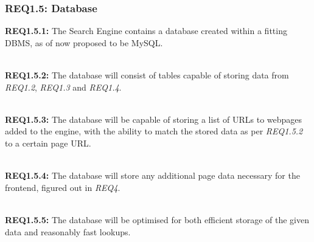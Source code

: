 \subsubsection{REQ1.5: Database}

\textbf{REQ1.5.1:} The Search Engine contains a database created within a fitting DBMS, as of now proposed to be MySQL.\par

\textbf{\\REQ1.5.2:} The database will consist of tables capable of storing data from \textit{REQ1.2}, \textit{REQ1.3} and \textit{REQ1.4}.\par

\textbf{\\REQ1.5.3:} The database will be capable of storing a list of URLs to webpages added to the engine, with the ability to match the stored data as per \textit{REQ1.5.2} to a certain page URL.\par

\textbf{\\REQ1.5.4:} The database will store any additional page data necessary for the frontend, figured out in \textit{REQ4}.\par

\textbf{\\REQ1.5.5:} The database will be optimised for both efficient storage of the given data and reasonably fast lookups.\par

